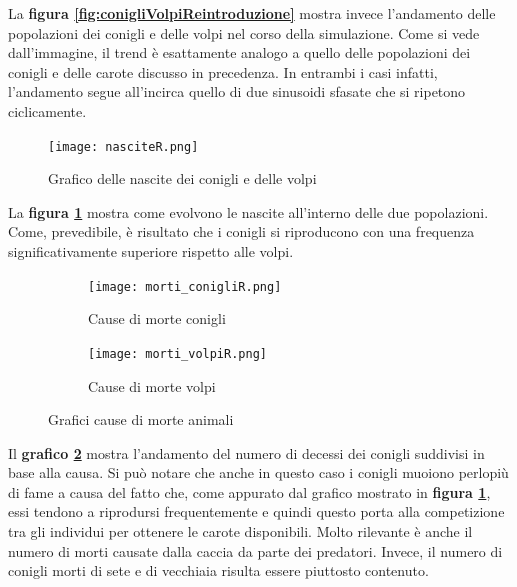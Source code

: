 \documentclass[11pt]{article}
\begin{document}
La \textbf{figura \ref{fig:conigliVolpiReintroduzione}} mostra invece l'andamento delle popolazioni dei conigli e delle volpi nel corso della simulazione. Come si vede dall'immagine, il trend è esattamente analogo a quello delle popolazioni dei conigli e delle carote discusso in precedenza. In entrambi i casi infatti, l'andamento segue all'incirca quello di due sinusoidi sfasate che si ripetono ciclicamente.


\begin{figure}[h!]
     \centering
     \texttt{[image: nasciteR.png]}
     \caption{Grafico delle nascite dei conigli e delle volpi}
     \label{fig:nasciteReintroduzione}
\end{figure}



La \textbf{figura \ref{fig:nasciteReintroduzione}} mostra come evolvono le nascite all'interno delle due popolazioni. Come, prevedibile, è risultato che i conigli si riproducono con una frequenza significativamente superiore rispetto alle volpi. 

\newpage

\begin{figure}[!ht]
	\begin{subfigure}{\textwidth}
         \centering
         \texttt{[image: morti\_conigliR.png]}
         \caption{Cause di morte conigli}
         \label{fig:morteConigliReintroduzione}
	\end{subfigure}
	\begin{subfigure}{\textwidth}
		\centering
        \texttt{[image: morti\_volpiR.png]}
        \caption{Cause di morte volpi}
        \label{fig:morteVolpiReintroduzione}
	\end{subfigure}
	\caption{Grafici cause di morte animali}
\end{figure}


Il \textbf{grafico \ref{fig:morteConigliReintroduzione}} mostra l'andamento del numero di decessi dei conigli suddivisi in base alla causa. Si può notare che anche in questo caso i conigli muoiono perlopiù di fame a causa del fatto che, come appurato dal grafico mostrato in \textbf{figura \ref{fig:nasciteReintroduzione}}, essi tendono a riprodursi frequentemente e quindi questo porta alla competizione tra gli individui per ottenere le carote disponibili. Molto rilevante è anche il numero di morti causate dalla caccia da parte dei predatori. Invece, il numero di conigli morti di sete e di vecchiaia risulta essere piuttosto contenuto. 
\end{document}
